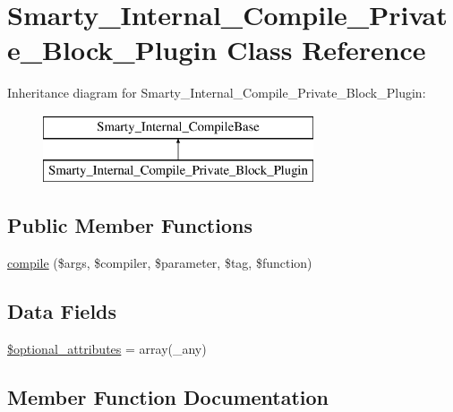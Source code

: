 \hypertarget{class_smarty___internal___compile___private___block___plugin}{}\section{Smarty\+\_\+\+Internal\+\_\+\+Compile\+\_\+\+Private\+\_\+\+Block\+\_\+\+Plugin Class Reference}
\label{class_smarty___internal___compile___private___block___plugin}
Inheritance diagram for Smarty\+\_\+\+Internal\+\_\+\+Compile\+\_\+\+Private\+\_\+\+Block\+\_\+\+Plugin\+:\begin{figure}[H]
\begin{center}
\leavevmode
\includegraphics[height=2.000000cm]{class_smarty___internal___compile___private___block___plugin}
\end{center}
\end{figure}
\subsection*{Public Member Functions}
\begin{DoxyCompactItemize}
\item 
\hyperlink{class_smarty___internal___compile___private___block___plugin_a738746fa10dc02e92fbfbc899ac2a01f}{compile} (\$args, \$compiler, \$parameter, \$tag, \$function)
\end{DoxyCompactItemize}
\subsection*{Data Fields}
\begin{DoxyCompactItemize}
\item 
\hyperlink{class_smarty___internal___compile___private___block___plugin_a899d1eb4a6fecbd6ce696adb171c80a4}{\$optional\+\_\+attributes} = array(\textquotesingle{}\+\_\+any\textquotesingle{})
\end{DoxyCompactItemize}


\subsection{Member Function Documentation}
\hypertarget{class_smarty___internal___compile___private___block___plugin_a738746fa10dc02e92fbfbc899ac2a01f}{}

